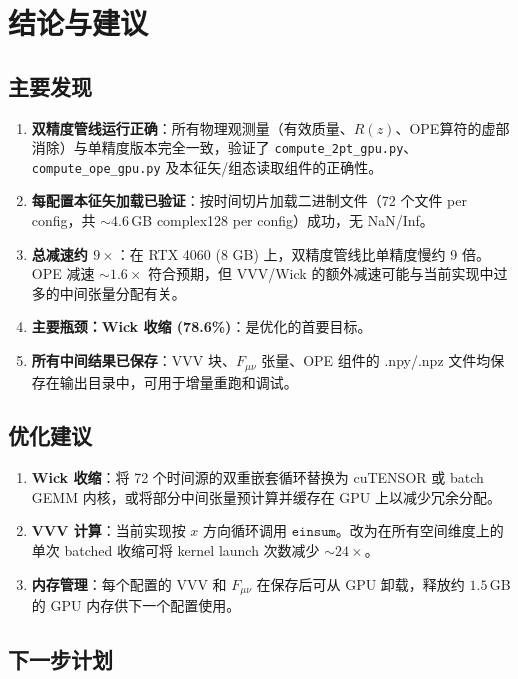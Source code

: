 \documentclass[12pt,a4paper]{ctexart}
\begin{document}
\section{结论与建议}

\subsection{主要发现}

\begin{enumerate}[itemsep=4pt]
  \item \textbf{双精度管线运行正确}：所有物理观测量（有效质量、$R(z)$、OPE算符的虚部消除）与单精度版本完全一致，验证了 \texttt{compute\_2pt\_gpu.py}、\texttt{compute\_ope\_gpu.py} 及本征矢/组态读取组件的正确性。
  \item \textbf{每配置本征矢加载已验证}：按时间切片加载二进制文件（72 个文件 per config，共 $\sim 4.6$\,GB complex128 per config）成功，无 NaN/Inf。
  \item \textbf{总减速约 $9\times$}：在 RTX 4060 (8 GB) 上，双精度管线比单精度慢约 9 倍。OPE 减速 $\sim 1.6\times$ 符合预期，但 VVV/Wick 的额外减速可能与当前实现中过多的中间张量分配有关。
  \item \textbf{主要瓶颈：Wick 收缩 (78.6\%)}：是优化的首要目标。
  \item \textbf{所有中间结果已保存}：VVV 块、$F_{\mu\nu}$ 张量、OPE 组件的 .npy/.npz 文件均保存在输出目录中，可用于增量重跑和调试。
\end{enumerate}

\subsection{优化建议}

\begin{enumerate}[itemsep=3pt]
  \item \textbf{Wick 收缩}：将 72 个时间源的双重嵌套循环替换为 cuTENSOR 或 batch GEMM 内核，或将部分中间张量预计算并缓存在 GPU 上以减少冗余分配。
  \item \textbf{VVV 计算}：当前实现按 $x$ 方向循环调用 $\mathtt{einsum}$。改为在所有空间维度上的单次 batched 收缩可将 kernel launch 次数减少 $\sim 24\times$。
  \item \textbf{内存管理}：每个配置的 VVV 和 $F_{\mu\nu}$ 在保存后可从 GPU 卸载，释放约 $1.5$\,GB 的 GPU 内存供下一个配置使用。
\end{enumerate}

\subsection{下一步计划}
\end{document}
